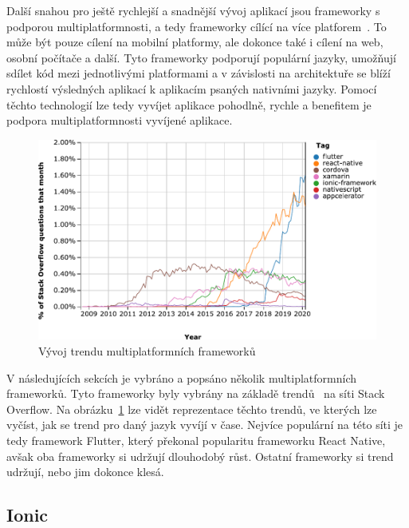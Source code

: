 Další snahou pro ještě rychlejší a snadnější vývoj aplikací jsou frameworky
s podporou multiplatformnosti,
a tedy frameworky cílící na více platforem~\cite{hackernoon_flutter}.
To může být pouze cílení na mobilní platformy,
ale dokonce také i cílení na web, osobní počítače a další.
Tyto frameworky podporují populární jazyky,
umožňují sdílet kód mezi jednotlivými platformami
a v závislosti na architektuře se blíží rychlostí výsledných aplikací
k aplikacím psaných nativními jazyky.
Pomocí těchto technologií lze tedy vyvíjet aplikace pohodlně, rychle
a benefitem  je podpora multiplatformnosti vyvíjené aplikace.
\cite{dashmagazine_mobile_frameworks}

\begin{figure}[ht!]
    \centering
    \includegraphics[width=\linewidth]{assets/technology-research/framework/popularity.pdf}
    \caption{Vývoj trendu multiplatformních
    frameworků~\cite{framework_popularity}}
    \label{fig:framework_popularity}
\end{figure}

V následujících sekcích je vybráno a popsáno několik multiplatformních
frameworků.
Tyto frameworky byly vybrány na základě trendů~\cite{framework_popularity}
na síti Stack Overflow.
Na obrázku~\ref{fig:framework_popularity} lze vidět reprezentace těchto trendů,
ve kterých lze vyčíst,
jak se trend pro daný jazyk vyvíjí v čase.
Nejvíce populární na této síti je tedy framework Flutter,
který překonal popularitu frameworku React Native,
avšak oba frameworky si udržují dlouhodobý růst.
Ostatní frameworky si trend udržují,
nebo jim dokonce klesá.

\subsection{Ionic}

